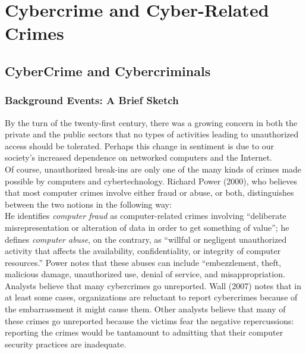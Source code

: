 \documentclass[12pt]{article}
\theoremstyle{definition}
\begin{document}
\section{Cybercrime and Cyber-Related Crimes}
\subsection{CyberCrime and Cybercriminals}
\subsubsection{Background Events: A Brief Sketch}
By the turn of the twenty-first century, there was a growing concern in both the private and the public sectors that no types of activities leading to unauthorized access should be tolerated. Perhaps this change in sentiment is due to our society’s increased dependence on networked computers and
the Internet.\\
Of course, unauthorized break-ins are only one of the many kinds of crimes made
possible by computers and cybertechnology. Richard Power (2000), who believes that
most computer crimes involve either fraud or abuse, or both, distinguishes between the
two notions in the following way:\\
He identifies \textit{computer fraud} as computer-related crimes involving “deliberate misrepresentation or alteration of data in order to get something of value”; he defines \textit{computer abuse}, on the contrary, as “willful or negligent unauthorized activity that affects the availability, confidentiality, or integrity of computer resources.” Power notes that these abuses can include “embezzlement, theft, malicious damage, unauthorized use, denial of service, and misappropriation.\\
Analysts believe that many cybercrimes go unreported. Wall (2007) notes that in at
least some cases, organizations are reluctant to report cybercrimes because of the
embarrassment it might cause them. Other analysts believe that many of these crimes
go unreported because the victims fear the negative repercussions: reporting the crimes
would be tantamount to admitting that their computer security practices are inadequate.
\end{document}
